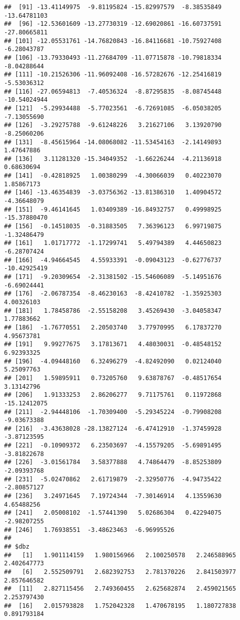 \documentclass[]{article}
\begin{document}
\begin{verbatim}
##  [91] -13.41149975  -9.81195824 -15.82997579  -8.38535849 -13.64781103
##  [96] -12.53601609 -13.27730319 -12.69020861 -16.60737591 -27.80665811
## [101] -12.05531761 -14.76820843 -16.84116681 -10.75927408  -6.28043787
## [106] -13.79330493 -11.27684709 -11.07715878 -10.79818334  -8.04288644
## [111] -10.21526306 -11.96092408 -16.57282676 -12.25416819  -5.53036312
## [116] -27.06594813  -7.40536324  -8.87295835  -8.08745448 -10.54024944
## [121]  -5.29934488  -5.77023561  -6.72691085  -6.05038205  -7.13055690
## [126]  -3.29275788  -9.61248226   3.21627106   3.13920790  -8.25060206
## [131]  -8.45615964 -14.08068082 -11.53454163  -2.14149893   1.47647886
## [136]   3.11281320 -15.34049352  -1.66226244  -4.21136918   0.68630694
## [141]  -0.42818925   1.00380299  -4.30066039   0.40223070   1.85867173
## [146] -13.46354839  -3.03756362 -13.81386310   1.40904572  -4.36648079
## [151]  -9.46141645   1.03409389 -16.84932757   0.49998925 -15.37880470
## [156]  -0.14518035  -0.31883505   7.36396123   6.99719875  -1.32486479
## [161]   1.01717772  -1.17299741   5.49794389   4.44650823  -6.28707424
## [166]  -4.94664545   4.55933391  -0.09043123  -0.62776737 -10.42925419
## [171]  -9.20309654  -2.31381502 -15.54606089  -5.14951676  -6.69024441
## [176]  -2.06787354  -8.46230163  -8.42410782  -1.35925303   4.00326103
## [181]   1.78458786  -2.55158208   3.45269430  -3.04058347   1.77883662
## [186]  -1.76770551   2.20503740   3.77970995   6.17837270   4.95673781
## [191]   9.99277675   3.17813671   4.48030031  -0.48548152   6.92393325
## [196]  -4.09448160   6.32496279  -4.82492090   0.02124040   5.25097763
## [201]   1.59895911   0.73205760   9.63878767  -0.48517654   3.13142796
## [206]   1.91333253   2.86206277   9.71175761   0.11972868 -15.12412075
## [211]  -2.94448106  -1.70309400  -5.29345224  -0.79908208  -9.03673388
## [216]  -3.43638028 -28.13827124  -6.47412910  -1.37459928  -3.87123595
## [221]  -0.10909372   6.23503697  -4.15579205  -5.69891495  -3.81822678
## [226]  -3.01561784   3.58377888   4.74864479  -8.85253809  -2.09393768
## [231]  -5.02470862   2.61719879  -2.32950776  -4.94735422  -2.80857127
## [236]   3.24971645   7.19724344  -7.30146914   4.13559630   4.65488256
## [241]   2.05008102  -1.57441390   5.02686304   0.42294075  -2.98207255
## [246]   1.76938551  -3.48623463  -6.96995526
## 
## $dbz
##   [1]   1.901114159   1.980156966   2.100250578   2.246588965   2.402647773
##   [6]   2.552509791   2.682392753   2.781370226   2.841503977   2.857646582
##  [11]   2.827115456   2.749360455   2.625682874   2.459021565   2.253797430
##  [16]   2.015793828   1.752042328   1.470678195   1.180727838   0.891793184

\end{verbatim}
\end{document}
